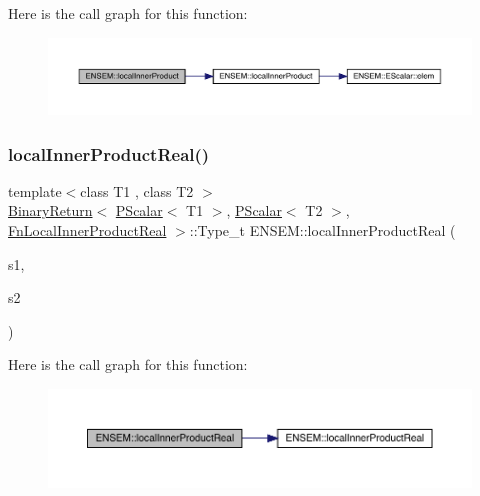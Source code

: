 Here is the call graph for this function\+:\nopagebreak
\begin{figure}[H]
\begin{center}
\leavevmode
\includegraphics[width=350pt]{db/dcc/group__primscalar_ga1190a8f3bd7590e615a59825ca33f2b6_cgraph}
\end{center}
\end{figure}
\mbox{\label{group__primscalar_ga014c96c783c136201ede1f2669b6d18b}} 
\subsubsection{\texorpdfstring{localInnerProductReal()}{localInnerProductReal()}}
{\footnotesize\ttfamily template$<$class T1 , class T2 $>$ \\
\mbox{\hyperlink{structENSEM_1_1BinaryReturn}{Binary\+Return}}$<$ \mbox{\hyperlink{classENSEM_1_1PScalar}{P\+Scalar}}$<$ T1 $>$, \mbox{\hyperlink{classENSEM_1_1PScalar}{P\+Scalar}}$<$ T2 $>$, \mbox{\hyperlink{structENSEM_1_1FnLocalInnerProductReal}{Fn\+Local\+Inner\+Product\+Real}} $>$\+::Type\+\_\+t E\+N\+S\+E\+M\+::local\+Inner\+Product\+Real (\begin{DoxyParamCaption}\item[{const \mbox{\hyperlink{classENSEM_1_1PScalar}{P\+Scalar}}$<$ T1 $>$ \&}]{s1,  }\item[{const \mbox{\hyperlink{classENSEM_1_1PScalar}{P\+Scalar}}$<$ T2 $>$ \&}]{s2 }\end{DoxyParamCaption})\hspace{0.3cm}{\ttfamily [inline]}}

Here is the call graph for this function\+:\nopagebreak
\begin{figure}[H]
\begin{center}
\leavevmode
\includegraphics[width=350pt]{db/dcc/group__primscalar_ga014c96c783c136201ede1f2669b6d18b_cgraph}
\end{center}
\end{figure}
\mbox{\label{group__primscalar_ga21e7b79db399d760e036194c689a5291}} 

